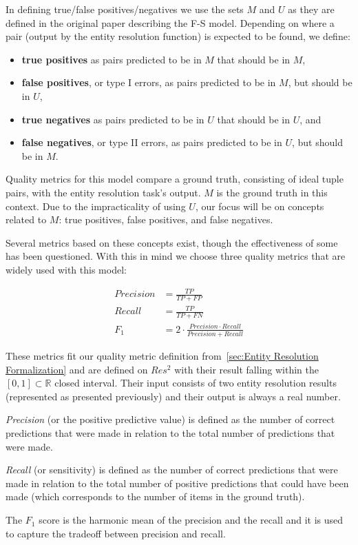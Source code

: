 In defining true/false positives/negatives we use the sets $M$ and $U$ as
they are defined in the original paper describing the F-S model.
Depending on where a pair (output by the entity resolution function) is
expected to be found, we define:

\begin{itemize}
    \item \textbf{true positives} as pairs predicted to be in $M$ that
    should be in $M$,
    \item \textbf{false positives}, or type I errors, as pairs predicted to
    be in $M$, but should be in $U$,
    \item \textbf{true negatives} as pairs predicted to be in $U$ that
    should be in $U$, and
    \item \textbf{false negatives}, or type II errors, as pairs predicted to
    be in $U$, but should be in $M$.
\end{itemize}

Quality metrics for this model compare a ground truth, consisting of ideal
tuple pairs, with the entity resolution task's output.
$M$ is the ground truth in this context.
Due to the impracticality of using $U$, our focus will be on concepts
related to $M$: true positives, false positives, and false negatives.

Several metrics based on these concepts exist, though the effectiveness of
some has been questioned\cite{Goga2015}.
With this in mind we choose three quality metrics that are widely used with
this model:

\begin{align}
Precision &= \frac{TP}{TP+FP}\nonumber \\
Recall &= \frac{TP}{TP+FN}\nonumber \\
F_1 &= 2 \cdot \frac{Precision \cdot Recall}{Precision+Recall}\nonumber
\end{align}

These metrics fit our quality metric definition from~\ref{sec:Entity Resolution Formalization}
and are defined on $Res^2$ with their result falling within the
$\left[0, 1\right] \subset \mathbb{R}$ closed interval.
Their input consists of two entity resolution results (represented as presented
previously) and their output is always a real number.

\textit{Precision} (or the positive predictive value) is defined as the
number of correct predictions that were made in relation to the total number
of predictions that were made.

\textit{Recall} (or sensitivity) is defined as the number of correct
predictions that were made in relation to the total number of positive
predictions that could have been made (which corresponds to the number of
items in the ground truth).

The \textit{$F_1$} score is the harmonic mean of the precision and the
recall and it is used to capture the tradeoff between precision and
recall\cite{hitesh2012}.

